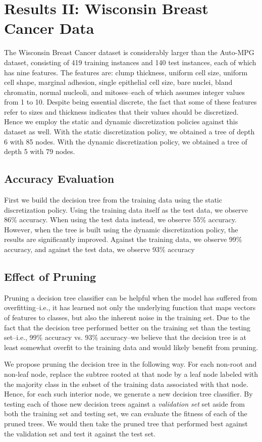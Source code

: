 \documentclass[12pt, conference, compsocconf]{IEEEtran}
\begin{document}
\section{Results II: Wisconsin Breast Cancer Data}
The Wisconsin Breast Cancer dataset is considerably larger than the Auto-MPG dataset, consisting of 419 training instances and 140 test instances, each of which has nine features. 
The features are: clump thickness, uniform cell size, uniform cell shape, marginal adhesion, single epithelial cell size, bare nuclei, bland chromatin, normal nucleoli, and mitoses--each of which assumes integer values from 1 to 10. 
Despite being essential discrete, the fact that some of these features refer to sizes and thickness indicates that their values should be discretized. Hence we employ the static and dynamic discretization policies against this dataset as well.  With the static discretization policy, we obtained a tree of depth 6 with 85 nodes.  With the dynamic discretization policy, we obtained a tree of depth 5 with 79 nodes.

\subsection{Accuracy Evaluation}
First we build the decision tree from the training data using the static discretization policy. 
Using the training data itself as the test data, we observe 86\% accuracy.
When using the test data instead, we observe 55\% accuracy.
However, when the tree is built using the dynamic discretization policy, the results are significantly improved.
Against the training data, we observe 99\% accuracy, and against the test data, we observe 93\% accuracy

\subsection{Effect of Pruning}
Pruning a decision tree classifier can be helpful when the model has suffered from overfitting--i.e., it has learned not only the underlying function that maps vectors of features to classes, but also the inherent noise in the training set. 
Due to the fact that the decision tree performed better on the training set than the testing set--i.e., 99\% accuracy vs. 93\% accuracy--we believe that the decision tree is at least somewhat overfit to the training data and would likely benefit from pruning. 

We propose pruning the decision tree in the following way. 
For each non-root and non-leaf node, replace the subtree rooted at that node by a leaf node labeled with the majority class in the subset of the training data associated with that node. 
Hence, for each such interior node, we generate a new decision tree classifier.
By testing each of those new decision trees against a \emph{validation set} set aside from both the training set and testing set, we can evaluate the fitness of each of the pruned trees. 
We would then take the pruned tree that performed best against the validation set and test it against the test set. 
\end{document}
